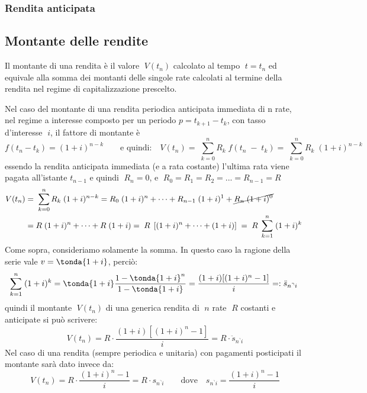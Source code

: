 \subsubsection{Rendita anticipata}

\subsection{Montante delle rendite}
Il montante di una rendita è il valore $\;V(t_n)$ calcolato al tempo $\;t=t_n$ 
ed equivale alla somma dei montanti delle singole rate calcolati al termine 
della rendita nel regime di capitalizzazione prescelto.


Nel caso del montante di una rendita periodica anticipata immediata di n rate, 
nel regime a interesse composto per un periodo 
$p= t_{k+1}-t_k$, con tasso d'interesse $\;i$, il fattore di montante è
$$f(t_n-t_k)=(1+i)^{n-k} \qquad \text{e quindi:} \quad V(t_n)=\; \sum^{n}_{k=0}R_k\; f(t_n\;-\;t_k)= \; \sum^{n}_{k=0}R_k\; 
(1+i)^{n-k}$$
essendo la rendita anticipata immediata (e a rata costante) l'ultima rata viene 
pagata all'istante $t_{n-1}$ e quindi $\;R_n=0$, e 
$\;R_{0}=R_{1}=R_{2}=...=R_{n-1}=R$
$$\begin{aligned}
   V(t_n)&=\; \sum^{n}_{k=0}R_k\; 
(1+i)^{n-k}= R_0\; 
(1+i)^{n}+\dots+R_{n-1}\; 
(1+i)^{1}+\cancel{R_n\; 
(1+i)^{0}}\\
&=R\; 
(1+i)^{n}+\dots + R\; 
(1+i)= \;R \;\left[(1+i)^n+\dots+(1+i)\right]\;=\;R\; 
\sum^{n}_{k=1}\; (1+i)^{k}
  \end{aligned}
$$
Come sopra, consideriamo solamente la somma. In questo caso la ragione
della serie vale $v = \tonda{1+i}$, perciò:
$$\sum^{n}_{k=1}\; (1+i)^{k} =\tonda{1+i} \frac{1-\tonda{1+i}^n}{1-\tonda{1+i}}=
\frac{(1+i)[(1+i)^{n}-1]}{i}=:\ddot{s}_{n^\urcorner i}$$
quindi il montante $\; V(t_n)$ di una generica rendita di $\;n$ rate $\;R$ 
costanti e anticipate si può scrivere:
$$\; V(t_n) = R\cdot\frac{(1+i)[(1+i)^{n}-1]}{i} = R\cdot\ddot{s}_{n^\urcorner 
i}$$
Nel caso di una rendita (sempre periodica e unitaria) con pagamenti posticipati il montante sarà dato invece da:
$$\; V(t_n)= R\cdot\frac{(1+i)^{n}-1}{i}= R\cdot s_{n^\urcorner i} \qquad \text{dove} \quad
s_{n^\urcorner i} = \frac{(1+i)^{n}-1}{i}$$



